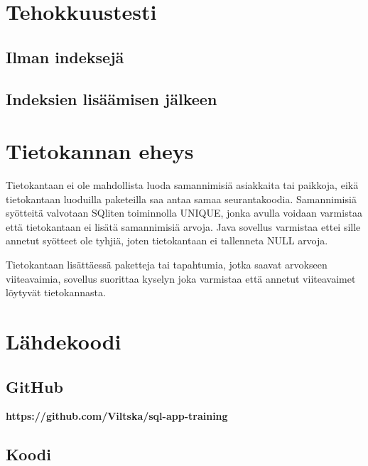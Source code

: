 \documentclass[12pt,a4paper]{article}
\begin{document}
\newpage
\section{Tehokkuustesti}
\subsection*{Ilman indeksejä}
\subsection*{Indeksien lisäämisen jälkeen}

\newpage
\section{Tietokannan eheys}
Tietokantaan ei ole mahdollista luoda samannimisiä asiakkaita tai paikkoja, eikä tietokantaan luoduilla paketeilla saa antaa samaa seurantakoodia. Samannimisiä syötteitä valvotaan SQliten toiminnolla UNIQUE, jonka avulla voidaan varmistaa että tietokantaan ei lisätä samannimisiä arvoja. Java sovellus varmistaa ettei sille annetut syötteet ole tyhjiä, joten tietokantaan ei tallenneta NULL arvoja.

Tietokantaan lisättäessä paketteja tai tapahtumia, jotka saavat arvokseen viiteavaimia, sovellus suorittaa kyselyn joka varmistaa että annetut viiteavaimet löytyvät tietokannasta.





\newpage
\section{Lähdekoodi}
\subsection*{GitHub}
\textbf{https://github.com/Viltska/sql-app-training}
\subsection*{Koodi}


\newpage
\end{document}
